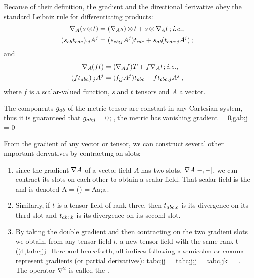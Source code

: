 Because of their definition, the gradient and the directional derivative obey the standard Leibniz rule for differentiating products:
\begin{align*}
                      \dder{(s\tprod t)}{A} &= (\dder sA)\tprod t + s\tprod\dder tA\,;\text{\ie,}\\
(\cotens s{ab}\cotens t{cde})_{;j}\cnvec Aj &= (\cotens s{ab;j}\cnvec Aj)\cotens t{cde} 
    + \cotens s{ab}(\cotens t{cde;j}\cnvec Aj)\,;
\end{align*}
and
\begin{align*}
                   \dder{(ft)}{A} &= (\dder fA)T + f\dder tA\,;\text{\ie,}\\
(f\cotens{t}{abc})_{;j}\cntens Aj &= (\cotens f{;j}\cntens Aj)\cotens t{abc} + f\cotens t{abc;j}\cntens Aj\,,
\end{align*}
where $f$ is a scalar-valued function, $s$ and $t$ tensors and $A$ a vector.

The components $\imet ab$ of the metric tensor are constant in any Cartesian system, thus it is guaranteed that $\cotens g{ab;j} = 0$; \ie, the metric has vanishing gradient
\beq
\dder\metric = 0,\qquad\text{\ie,}\quad \cotens g{ab;j} = 0
\eeq

From the gradient of any vector or tensor, we can construct several other important derivatives by contracting on slots:
\begin{enumerate}
\item since the gradient $\gder A$ of a vector field $A$ has two slots, $\gder A\vat{\slot,\slot}$, we can contract its slots on each other to obtain a scalar field. That scalar field is the  and is denoted
\beq
\gder\iprod A = () = \cotens A{a;a}\,.
\eeq
%
\item Similarly, if $t$ is a tensor field of rank three, then $\cotens t{abc;c}$ is its divergence on its third slot and $\cotens t{abc;b}$ is its divergence on its second slot.
%
\item By taking the double gradient and then contracting on the two gradient slots we obtain, from any tensor field $t$, a new tensor field with the same rank
\beq
\lder t  (\gder\iprod\gder)t\,,\quad{}\cotens t{abc;jj}\,.
\eeq
Here and henceforth, all indices following a semicolon or comma represent gradients (or partial derivatives):
\beq
\cotens t{abc;jj} = \cotens t{abc;j;j} 
                  = \cotens t{abc,jk} 
                  = \,.
\eeq
The operator $\lder$ is called the .
\end{enumerate}

